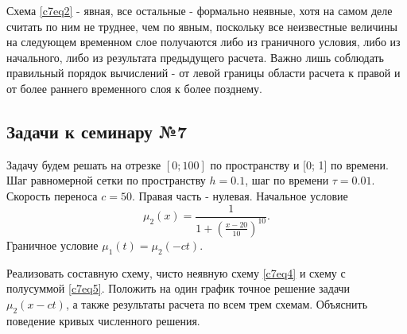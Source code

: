 Схема \eqref{c7eq2} - явная, все остальные - формально неявные, хотя на самом деле считать по ним не труднее, чем по явным, поскольку все неизвестные величины на следующем временном слое получаются либо из граничного условия, либо из начального, либо из результата предыдущего расчета. Важно лишь соблюдать правильный порядок вычислений - от левой границы области расчета к правой и от более раннего временного слоя к более позднему.

\subsection{Задачи к семинару №7}
Задачу будем решать на отрезке  $[0; 100]$ по пространству и   [0; 1] по времени. Шаг равномерной сетки по пространству $h = 0.1$, шаг по времени $\tau = 0.01$. Скорость переноса $c = 50$. Правая часть - нулевая. Начальное условие
\begin{equation} \nonumber
	\mu_2(x) = \frac{1}{1 + \left( \displaystyle \frac{x-20}{10} \right)^{10}}.
\end{equation}
Граничное условие $\mu_1(t) = \mu_2(-ct)$.

Реализовать составную схему, чисто неявную схему \eqref{c7eq4} и схему с полусуммой \eqref{c7eq5}. Положить на один график точное решение задачи $\mu_2(x-ct)$, а также результаты расчета по всем трем схемам. Объяснить поведение кривых численного решения.
